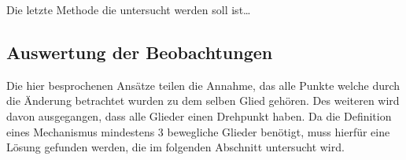 Die letzte Methode die untersucht werden soll ist\dots

\subsection{Auswertung der Beobachtungen}


Die hier besprochenen Ansätze teilen die Annahme, das alle Punkte welche durch die Änderung betrachtet wurden zu dem selben Glied gehören.
Des weiteren wird davon ausgegangen, dass alle Glieder einen Drehpunkt haben.
Da die Definition eines Mechanismus mindestens 3 bewegliche Glieder benötigt, muss hierfür eine Lösung gefunden werden, die im folgenden Abschnitt untersucht wird.

